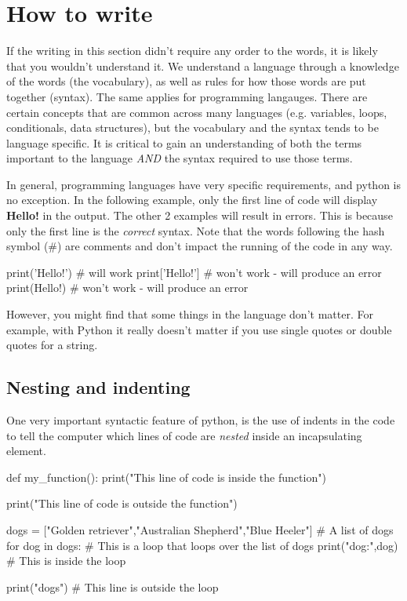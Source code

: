 \section{How to write}

If the writing in this section didn't require any order to the words, it is likely that you wouldn't understand it. We understand a language through a knowledge of the words (the vocabulary), as well as rules for how those words are put together (syntax). The same applies for programming langauges. There are certain concepts that are common across many languages (e.g. variables, loops, conditionals, data structures), but the vocabulary and the syntax tends to be language specific. It is critical to gain an understanding of both the terms important to the language \textit{AND} the syntax required to use those terms.

In general, programming languages have very specific requirements, and python is no exception. In the following example, only the first line of code will display \textbf{Hello!} in the output. The other 2 examples will result in errors. This is because only the first line is the \textit{correct} syntax. Note that the words following the hash symbol (\#) are comments and don't impact the running of the code in any way.

\begin{pycode}
    print('Hello!') # will work
    print['Hello!'] # won't work - will produce an error
    print(Hello!) # won't work - will produce an error
\end{pycode}

However, you might find that some things in the language don't matter. For example, with Python it really doesn't matter if you use single quotes or double quotes for a string.

\subsection{Nesting and indenting}

One very important syntactic feature of python, is the use of indents in the code to tell the computer which lines of code are \textit{nested} inside an incapsulating element.

\begin{pycode}
    def my_function():
        print("This line of code is inside the function")

    print("This line of code is outside the function")

    dogs = ["Golden retriever","Australian Shepherd","Blue Heeler"] # A list of dogs
    for dog in dogs: # This is a loop that loops over the list of dogs
        print("dog:",dog) # This is inside the loop

    print("dogs") # This line is outside the loop
\end{pycode}


